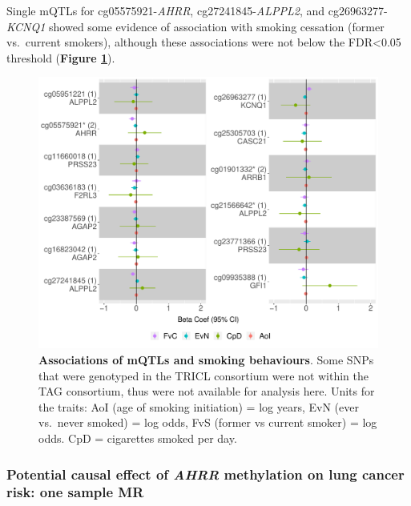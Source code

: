 \documentclass[11pt,oneside]{bristolthesis}
\begin{document}
Single mQTLs for cg05575921-\emph{AHRR}, cg27241845-\emph{ALPPL2}, and cg26963277-\emph{KCNQ1} showed some evidence of association with smoking cessation (former vs.~current smokers), although these associations were not below the FDR\textless0.05 threshold (\textbf{Figure \ref{fig:sup-fig4-07}}).




\begin{figure}

{\centering \includegraphics[width=1\linewidth]{figure/07-dnam_lungcancer_mr/sup_fig4-mqtl_smoking_mr} 

}

\caption[Associations of mQTLs and smoking behaviours]{\textbf{Associations of mQTLs and smoking behaviours}. Some SNPs that were genotyped in the TRICL consortium were not within the TAG consortium, thus were not available for analysis here. Units for the traits: AoI (age of smoking initiation) = log years, EvN (ever vs.~never smoked) = log odds, FvS (former vs current smoker) = log odds. CpD = cigarettes smoked per day.}\label{fig:sup-fig4-07}
\end{figure}
\hypertarget{ahrr-one-sample-mr}{%
\subsubsection{\texorpdfstring{Potential causal effect of \emph{AHRR} methylation on lung cancer risk: one sample MR}{Potential causal effect of AHRR methylation on lung cancer risk: one sample MR}}\label{ahrr-one-sample-mr}}
\end{document}

